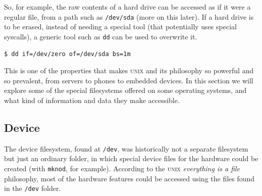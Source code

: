 \documentclass[a4paper]{article}
\begin{document}
So, for example, the raw contents of a hard drive can be accessed as if it were a regular file, from a path such as \verb|/dev/sda| (more on this later). If a hard drive is to be erased, instead of needing a special tool (that potentially uses special syscalls), a generic tool such as \verb|dd| can be used to overwrite it.

\begin{verbatim}
$ dd if=/dev/zero of=/dev/sda bs=1m
\end{verbatim}

This is one of the properties that makes \textsc{unix} and its philosophy so powerful and so prevalent, from servers to phones to embedded devices. In this section we will explore some of the special filesystems offered on some operating systems, and what kind of information and data they make accessible.

\subsection{Device}


The device filesystem, found at \verb|/dev|, was historically not a separate filesystem but just an ordinary folder, in which special device files for the hardware could be created (with \verb|mknod|, for example). According to the \textsc{unix} \emph{everything is a file} philosophy, most of the hardware features could be accessed using the files found in the \verb|/dev| folder.
\end{document}
